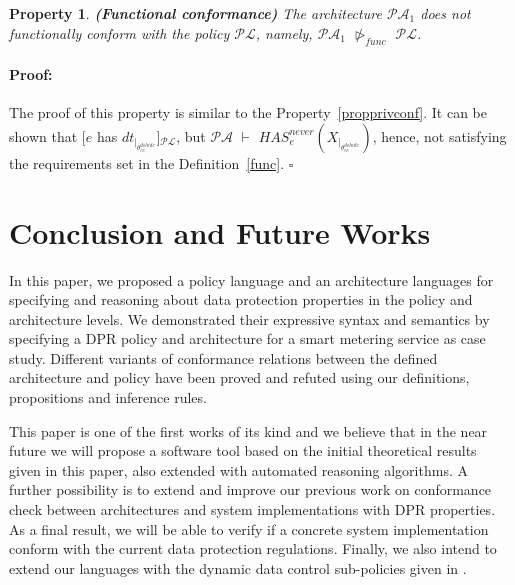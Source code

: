 \documentclass[a4paper]{article}
\newtheorem{ttp}{Property}
\newenvironment{proof}{\paragraph{Proof:}}{\hfill$\square$}
\begin{document}
\begin{ttp} \textbf{(Functional conformance)}
The architecture $\mathcal{P}$$\mathcal{A}_1$ does \textit{not functionally conform} with the policy $\mathcal{P}$$\mathcal{L}$, namely, $\mathcal{P}$$\mathcal{A}_1$ $\ntriangleright_{func}$ $\mathcal{P}$$\mathcal{L}$.   
\end{ttp}
\begin{proof} 
The proof of this property is similar to the Property~\ref{propprivconf}. It can be shown that $[e$ has $dt_{|_{\theta^{dshide}_{ec}}}]$$_{\mathcal{P}\mathcal{L}}$, but $\mathcal{P}\mathcal{A}$ $\vdash$ $\textit{HAS}_e^\textit{never} \left(X_{|_{\theta^{dshide}_{ec}}} \right)$, hence, not satisfying the requirements set in the Definition~\ref{func}.    
\end{proof} 

\section{Conclusion and Future Works}
In this paper, we proposed a policy language and an architecture languages for specifying and reasoning about data protection properties in the policy and architecture levels. We demonstrated their expressive syntax and semantics by specifying a DPR policy and architecture for a smart metering service as case study. Different variants of conformance relations between the defined architecture and policy have been proved and refuted using our definitions,  propositions and inference rules. 

This paper is one of the first works of its kind and we believe that in the near future we will propose a software tool based on the initial  theoretical results given in this paper, also extended with automated reasoning algorithms. A further possibility is to extend and improve our previous work on conformance check between architectures and system implementations \cite{TaAntignac14} with DPR properties. As a final result, we will be able to verify if a concrete system implementation conform with the current data protection regulations. Finally, we also intend to extend our languages with the dynamic data control sub-policies given in \cite{TaArxiv15}.    
  
 


 
\end{document}
